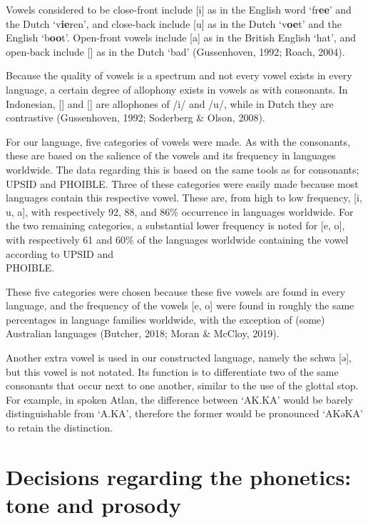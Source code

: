 Vowels considered to be close-front include [i] as in the English word ‘fr{\bf ee}’ and the Dutch ‘v{\bf ie}ren’, and close-back include [u] as in the Dutch ‘v{\bf oe}t’ and the English ‘b{\bf oo}t’. Open-front vowels include [a] as in the British English ‘hat’, and open-back include [\textscripta] as in the Dutch ‘bad’ (Gussenhoven, 1992; Roach, 2004). 

Because the quality of vowels is a spectrum and not every vowel exists in every language, a certain degree of allophony exists in vowels as with consonants. In Indonesian, [\textsci] and [\textupsilon] are allophones of /i/ and /u/, while in Dutch they are contrastive (Gussenhoven, 1992; Soderberg \& Olson, 2008). 

For our language, five categories of vowels were made. As with the consonants, these are based on the salience of the vowels and its frequency in languages worldwide. The data regarding this is based on the same tools as for consonants; UPSID and PHOIBLE. Three of these categories were easily made because most languages contain this respective vowel. These are, from high to low frequency, [i, u, a], with respectively 92, 88, and 86\% occurrence in languages worldwide. For the two remaining categories, a substantial lower frequency is noted for [e, o], with respectively 61 and 60\% of the languages worldwide containing the vowel according to UPSID and \\ PHOIBLE. 

These five categories were chosen because these five vowels are found  in every language, and the frequency of the vowels [e, o] were found  in roughly the same percentages in language families worldwide, with the exception of (some) Australian languages (Butcher, 2018; Moran \& McCloy, 2019). 

Another extra vowel is used in our constructed language, namely the schwa [ə], but this vowel is not notated. Its function is to differentiate two of the same consonants that occur next to one another, similar to the use of the glottal stop. For example, in spoken Atlan, the difference between ‘AK.KA’ would be barely distinguishable from ‘A.KA’, therefore the former would be pronounced ‘AKəKA’ to retain the distinction. 

\section{Decisions regarding the phonetics: tone and prosody}

